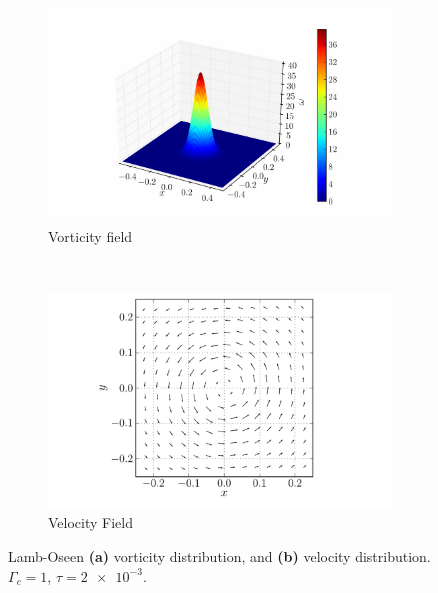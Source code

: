\begin{figure}[!t]
        \centering
        \begin{subfigure}[b]{0.5\textwidth}
                \includegraphics[width=\textwidth]{figures/lagrangian/lambOseen_vorticityDistribution_compressed.pdf}
                \caption{Vorticity field}
                \label{fig:lambOseen_vorticityDistribution}
        \end{subfigure}%
        ~ %
        \begin{subfigure}[b]{0.5\textwidth}
                \includegraphics[width=\textwidth]{figures/lagrangian/lambOseen_velocityDistribution_compressed.pdf}
                \caption{Velocity Field}
                \label{fig:lambOseen_velocityDistribution}
        \end{subfigure}
        \caption{Lamb-Oseen \textbf{(a)} vorticity distribution, and \textbf{(b)} velocity distribution. $\Gamma_c = 1$, $\tau=\num{2e-3}$.}
        \label{fig:lambOseen_distributions}
\end{figure}


